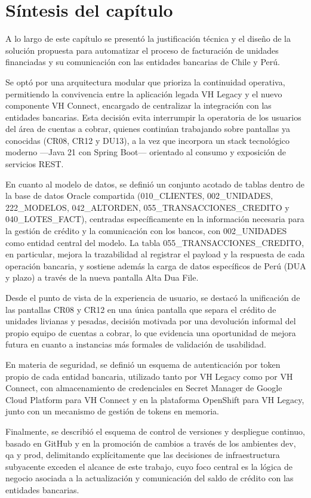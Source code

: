 \section{Síntesis del capítulo}

A lo largo de este capítulo se presentó la justificación técnica y el diseño de la solución propuesta para automatizar el proceso de facturación de unidades financiadas y su comunicación con las entidades bancarias de Chile y Perú.

Se optó por una arquitectura modular que prioriza la continuidad operativa, permitiendo la convivencia entre la aplicación legada VH Legacy y el nuevo componente VH Connect, encargado de centralizar la integración con las entidades bancarias. Esta decisión evita interrumpir la operatoria de los usuarios del área de cuentas a cobrar, quienes continúan trabajando sobre pantallas ya conocidas (CR08, CR12 y DU13), a la vez que incorpora un stack tecnológico moderno ---Java 21 con Spring Boot--- orientado al consumo y exposición de servicios REST.

En cuanto al modelo de datos, se definió un conjunto acotado de tablas dentro de la base de datos Oracle compartida (010\_CLIENTES, 002\_UNIDADES, 222\_MODELOS, 042\_ALTORDEN, 055\_TRANSACCIONES\_CREDITO y 040\_LOTES\_FACT), centradas específicamente en la información necesaria para la gestión de crédito y la comunicación con los bancos, con 002\_UNIDADES como entidad central del modelo. La tabla 055\_TRANSACCIONES\_CREDITO, en particular, mejora la trazabilidad al registrar el payload y la respuesta de cada operación bancaria, y sostiene además la carga de datos específicos de Perú (DUA y plazo) a través de la nueva pantalla Alta Dua File.

Desde el punto de vista de la experiencia de usuario, se destacó la unificación de las pantallas CR08 y CR12 en una única pantalla que separa el crédito de unidades livianas y pesadas, decisión motivada por una devolución informal del propio equipo de cuentas a cobrar, lo que evidencia una oportunidad de mejora futura en cuanto a instancias más formales de validación de usabilidad.

En materia de seguridad, se definió un esquema de autenticación por token propio de cada entidad bancaria, utilizado tanto por VH Legacy como por VH Connect, con almacenamiento de credenciales en Secret Manager de Google Cloud Platform para VH Connect y en la plataforma OpenShift para VH Legacy, junto con un mecanismo de gestión de tokens en memoria.

Finalmente, se describió el esquema de control de versiones y despliegue continuo, basado en GitHub y en la promoción de cambios a través de los ambientes dev, qa y prod, delimitando explícitamente que las decisiones de infraestructura subyacente exceden el alcance de este trabajo, cuyo foco central es la lógica de negocio asociada a la actualización y comunicación del saldo de crédito con las entidades bancarias.

